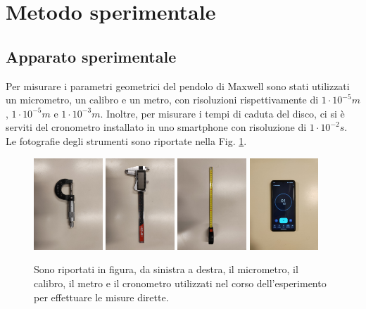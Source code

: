 \documentclass{article}
\begin{document}
\section{Metodo sperimentale}
\subsection{Apparato sperimentale}
Per misurare i parametri geometrici del pendolo di Maxwell sono stati utilizzati un micrometro, un calibro e un metro, con risoluzioni rispettivamente di $ 1 \cdot 10^{-5} m $, $ 1 \cdot 10^{-5} m $ e $ 1 \cdot 10^{-3} m $. Inoltre, per misurare i tempi di caduta del disco, ci si è serviti del cronometro installato in uno smartphone con risoluzione di $ 1 \cdot 10^{-2} s $. Le fotografie degli strumenti sono riportate nella Fig. \ref{strumenti}.

\begin{figure}[ht!]
\centering
\includegraphics[width=0.23\textwidth]{images/micrometro.jpg}
\hspace{2pt}
\includegraphics[width=0.23\textwidth]{images/calibro.jpg}
\hspace{2pt}
\includegraphics[width=0.23\textwidth]{images/metro.jpg}
\hspace{2pt}
\includegraphics[width=0.23\textwidth]{images/cronometro.jpg}
\caption{Sono riportati in figura, da sinistra a destra, il micrometro, il calibro, il metro e il cronometro utilizzati nel corso dell'esperimento per effettuare le misure dirette.}
\label{strumenti}
\end{figure}
\end{document}
